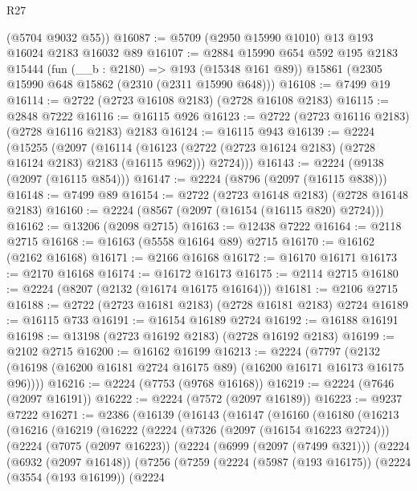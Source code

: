 \begin{lexlean}{R27}
\begin{coremodule}
      (@5704 @9032 @55))
@16087 := @5709 (@2950 @15990 @1010) @13 @193 @16024 @2183 @16032 @89
@16107 := @2884
    @15990
    @654
    @592
    @195
    @2183
    @15444
    (fun (__b : @2180) => @193 (@15348 @161 @89))
    @15861
    (@2305 @15990 @648 @15862 (@2310 (@2311 @15990 @648)))
@16108 := @7499 @19
@16114 := @2722 (@2723 @16108 @2183) (@2728 @16108 @2183)
@16115 := @2848 @7222
@16116 := @16115 @926
@16123 := @2722 (@2723 @16116 @2183) (@2728 @16116 @2183) @2183
@16124 := @16115 @943
@16139 := @2224
    (@15255
      (@2097
        (@16114
          (@16123 (@2722 (@2723 @16124 @2183) (@2728 @16124 @2183) @2183 (@16115 @962)))
          @2724)))
@16143 := @2224 (@9138 (@2097 (@16115 @854)))
@16147 := @2224 (@8796 (@2097 (@16115 @838)))
@16148 := @7499 @89
@16154 := @2722 (@2723 @16148 @2183) (@2728 @16148 @2183)
@16160 := @2224 (@8567 (@2097 (@16154 (@16115 @820) @2724)))
@16162 := @13206 (@2098 @2715)
@16163 := @12438 @7222
@16164 := @2118 @2715
@16168 := @16163 (@5558 @16164 @89) @2715
@16170 := @16162 (@2162 @16168)
@16171 := @2166 @16168
@16172 := @16170 @16171
@16173 := @2170 @16168
@16174 := @16172 @16173
@16175 := @2114 @2715
@16180 := @2224 (@8207 (@2132 (@16174 @16175 @16164)))
@16181 := @2106 @2715
@16188 := @2722 (@2723 @16181 @2183) (@2728 @16181 @2183) @2724
@16189 := @16115 @733
@16191 := @16154 @16189 @2724
@16192 := @16188 @16191
@16198 := @13198 (@2723 @16192 @2183) (@2728 @16192 @2183)
@16199 := @2102 @2715
@16200 := @16162 @16199
@16213 := @2224
    (@7797 (@2132 (@16198 (@16200 @16181 @2724 @16175 @89) (@16200 @16171 @16173 @16175 @96))))
@16216 := @2224 (@7753 (@9768 @16168))
@16219 := @2224 (@7646 (@2097 @16191))
@16222 := @2224 (@7572 (@2097 @16189))
@16223 := @9237 @7222
@16271 := @2386
    (@16139
      (@16143
        (@16147
          (@16160
            (@16180
              (@16213
                (@16216
                  (@16219
                    (@16222
                      (@2224
                        (@7326 (@2097 (@16154 @16223 @2724)))
                        (@2224
                          (@7075 (@2097 @16223))
                          (@2224
                            (@6999 (@2097 (@7499 @321)))
                            (@2224
                              (@6932 (@2097 @16148))
                              (@7256
                                (@7259
                                  (@2224
                                    (@5987 (@193 @16175))
                                    (@2224
                                      (@3554 (@193 @16199))
                                      (@2224

\end{coremodule}
\end{lexlean}
